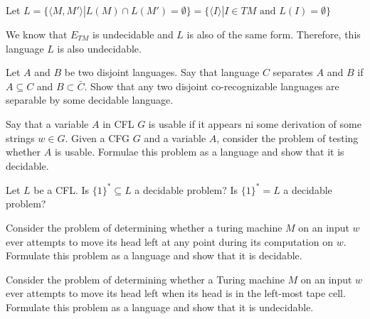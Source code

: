 \documentclass[12pt]{exam}
\begin{document}
\begin{questions}
\begin{solution}
\begin{enumerate}[a)]
            Let $L=\{\langle M,M'\rangle| L(M)\cap L(M') = \emptyset\} = \{\langle I\rangle| I\in TM \text{ and } L(I) = \emptyset\}$

            We know that $E_{TM}$ is undecidable and $L$ is also of the same form. Therefore, this language $L$ is also undecidable.
    \end{enumerate}


  \end{solution}


  \question{}
  Let $A$ and $B$ be two disjoint languages. Say that language $C$ separates $A$ and $B$ if $A\subseteq C$ and $B\subset \bar C$. Show that any two disjoint co-recognizable languages are separable by some decidable language.


  \question{}
  Say that a variable $A$ in CFL $G$ is usable if it appears ni some derivation of some strings $w\in G$. Given a CFG $G$ and a variable $A$, consider the problem of testing whether $A$ is usable.
  Formulae this problem as a language and show that it is decidable.


  \question{}
  Let $L$ be a CFL. Is $\{1\}^{*}\subseteq L$ a decidable problem?
  Is $\{1\}^{*}=L$ a decidable problem?

  \question{}
  Consider the problem of determining whether a turing machine $M$ on an input $w$ ever attempts to move its head left at any point during its computation on $w$. Formulate this problem as a language and show that it is decidable.


  \question{}
  Consider the problem of determining whether a Turing machine $M$ on an input $w$ ever
  attempts to move its head left when its head is in the left-most tape cell.
  Formulate this problem as a language and show that it is undecidable.

\end{questions}
\end{document}
